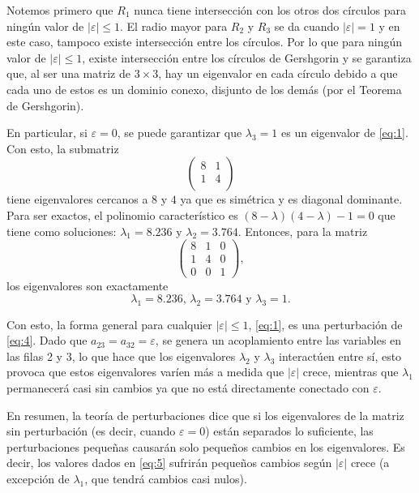 Notemos primero que $R_{1}$ nunca tiene intersección con los otros dos círculos para ningún valor de $\left|\varepsilon\right| \leq 1$. El radio mayor para $R_2$ y $R_3$ se da cuando $\left|\varepsilon\right| = 1$ y en este caso, tampoco existe intersección entre los círculos. Por lo que para ningún valor de $\left|\varepsilon\right| \leq 1$, existe intersección entre los círculos de Gershgorin y se garantiza que, al ser una matriz de $3\times3$, hay un eigenvalor en cada círculo debido a que cada uno de estos es un dominio conexo, disjunto de los demás (por el Teorema de Gershgorin).

En particular, si $\varepsilon=0$, se puede garantizar que $\lambda_3=1$ es un eigenvalor de \eqref{eq:1}. Con esto, la submatriz
\begin{equation}
	\begin{pmatrix}
		8 & 1 \\
		1 & 4 \\
	\end{pmatrix}
\end{equation}
tiene eigenvalores cercanos a $8$ y $4$ ya que es simétrica y es diagonal dominante. Para ser exactos, el polinomio característico es $(8-\lambda)(4-\lambda) - 1=0$ que tiene como soluciones: $\lambda_1=8.236$ y $\lambda_2=3.764$. Entonces, para la matriz
	\begin{equation} \label{eq:4}
	\begin{pmatrix}
		8 & 1 & 0\\
		1 & 4 & 0\\
		0 & 0 & 1
	\end{pmatrix},
\end{equation}
los eigenvalores son exactamente
\begin{equation} \label{eq:5}
	\lambda_1=8.236\text{, } \lambda_2=3.764 \text{ y }\lambda_3=1.
\end{equation}

Con esto, la forma general para cualquier $\left|\varepsilon\right| \leq 1$, \eqref{eq:1}, es una perturbación de \eqref{eq:4}. Dado que $a_{23}=a_{32}=\varepsilon$, se genera un acoplamiento entre las variables en las filas 2 y 3,  lo que hace que los eigenvalores $\lambda_2$ y $\lambda_3$ interactúen entre sí, esto provoca que estos eigenvalores varíen más a medida que $\left|\varepsilon\right|$ crece, mientras que $\lambda_1$ permanecerá casi sin cambios ya que no está directamente conectado con $\varepsilon$.

En resumen, la teoría de perturbaciones dice que si los eigenvalores de la matriz sin perturbación (es decir, cuando $\varepsilon=0$) están separados lo suficiente, las perturbaciones pequeñas causarán solo pequeños cambios en los eigenvalores. Es decir, los valores dados en \eqref{eq:5} sufrirán pequeños cambios según $\left|\varepsilon\right|$ crece (a excepción de $\lambda_1$, que tendrá cambios casi nulos).

